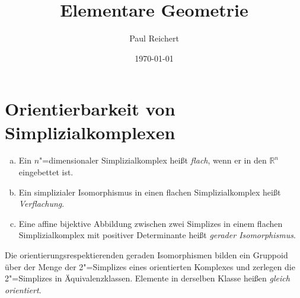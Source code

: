\documentclass[ngerman, 11pt, a4paper, twoside, abstracton]{scrartcl}
\newcommand{\R}{\mathbb{R}}
\begin{document}
\renewcommand{\titlepagestyle}{empty}

\pagestyle{empty}

\subject{Notizen}
\title{Elementare Geometrie}
\author{Paul Reichert}
\date{\today}

\maketitle

\section{Orientierbarkeit von Simplizialkomplexen}

\begin{definition}
  \begin{enumerate}[(a)]
    \item Ein $n$"=dimensionaler Simplizialkomplex heißt \emph{flach}, wenn er in den $\R^n$ eingebettet ist.
    \item Ein simplizialer Isomorphismus in einen flachen Simplizialkomplex heißt \emph{Verflachung}.
    \item Eine affine bijektive Abbildung zwischen zwei Simplizes in einem flachen Simplizialkomplex mit positiver Determinante heißt \emph{gerader Isomorphismus}.
  \end{enumerate}
\end{definition}

\begin{remark}
  Die orientierungsrespektierenden geraden Isomorphismen bilden ein Gruppoid über der Menge der 2"=Simplizes eines orientierten Komplexes und zerlegen die 2"=Simplizes in Äquivalenzklassen. Elemente in derselben Klasse heißen \emph{gleich orientiert}.
\end{remark}
\end{document}
